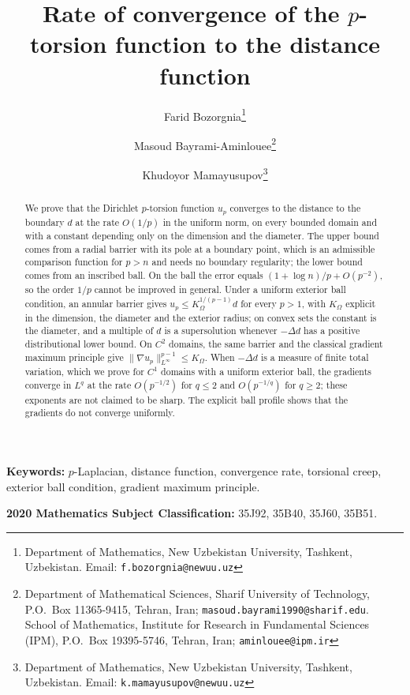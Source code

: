 \documentclass[11pt]{article}
\title{Rate of convergence of the $p$-torsion function to the distance function}
\author{Farid Bozorgnia\thanks{Department of Mathematics, New Uzbekistan University, Tashkent, Uzbekistan. Email: \texttt{f.bozorgnia@newuu.uz}}
\and
Masoud Bayrami-Aminlouee\thanks{Department of Mathematical Sciences, Sharif University of Technology, P.O.\ Box 11365-9415, Tehran, Iran; \texttt{masoud.bayrami1990@sharif.edu}. School of Mathematics, Institute for Research in Fundamental Sciences (IPM), P.O.\ Box 19395-5746, Tehran, Iran; \texttt{aminlouee@ipm.ir}}
\and
Khudoyor Mamayusupov\thanks{Department of Mathematics, New Uzbekistan University, Tashkent, Uzbekistan. Email: \texttt{k.mamayusupov@newuu.uz}}
}
\date{}
\newcommand{\norm}[1]{\lVert #1\rVert}
\theoremstyle{definition}
\theoremstyle{remark}
\begin{document}
\maketitle

\begin{abstract}
We prove that the Dirichlet $p$-torsion function $u_p$ converges to the
distance to the boundary $d$ at the rate $O(1/p)$ in the uniform norm, on
every bounded domain and with a constant depending only on the dimension and
the diameter. The upper bound comes from a radial barrier with its pole at a
boundary point, which is an admissible comparison function for $p>n$ and
needs no boundary regularity; the lower bound comes from an inscribed ball.
On the ball the error equals $(1+\log n)/p+O(p^{-2})$, so the order $1/p$
cannot be improved in general. Under a uniform exterior ball condition, an
annular barrier gives $u_p\le K_\Omega^{1/(p-1)}d$ for every $p>1$, with
$K_\Omega$ explicit in the dimension, the diameter and the exterior radius; on
convex sets the constant is the diameter, and a multiple of $d$ is a
supersolution whenever $-\Delta d$ has a positive distributional lower bound.
On $C^2$ domains, the same barrier and the classical gradient maximum principle
give $\norm{\nabla u_p}_{L^\infty}^{p-1}\le K_\Omega$. When $-\Delta d$ is a
measure of finite total variation, which we prove for $C^1$ domains with a
uniform exterior ball, the gradients converge in $L^q$ at the rate
$O(p^{-1/2})$ for $q\le2$ and $O(p^{-1/q})$ for $q\ge2$; these exponents are
not claimed to be sharp. The explicit ball profile shows that the gradients
do not converge uniformly.
\end{abstract}
\medskip
\noindent\textbf{Keywords:} $p$-Laplacian, distance function, convergence rate,
torsional creep, exterior ball condition, gradient maximum principle.

\medskip
\noindent\textbf{2020 Mathematics Subject Classification:}
35J92, 35B40, 35J60, 35B51.

\end{document}
